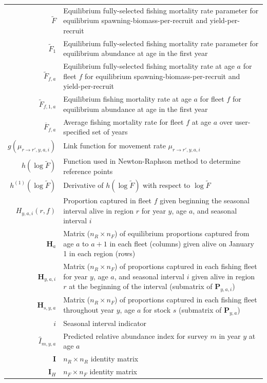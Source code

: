 \documentclass[
]{article}
\begin{document}
\begin{longtable}[c]{r p{}}
$\widetilde{F}$ & Equilibrium fully-selected fishing mortality rate parameter for equilibrium spawning-biomass-per-recruit and yield-per-recruit\\
$\widetilde{F}_1$ & Equilibrium fully-selected fishing mortality rate parameter for equilibrium abundance at age in the first year\\
$\widetilde{F}_{f,a}$ & Equilibrium fully-selected fishing mortality rate at age $a$ for fleet $f$ for equilibrium spawning-biomass-per-recruit and yield-per-recruit\\
$\widetilde{F}_{f,1,a}$ & Equilibrium fishing mortality rate at age $a$ for fleet $f$ for equilibrium abundance at age in the first year\\
$\overline{F}_{f,a}$ & Average fishing mortality rate for fleet $f$ at age $a$ over user-specified set of years\\
$g(\mu_{r\rightarrow r',y,a,i})$ & Link function for movement rate $\mu_{r\rightarrow r',y,a,i}$\\
$h(\log \widetilde{F})$ & Function used in Newton-Raphson method to determine reference points\\
$h^{(1)}(\log \widetilde{F})$ & Derivative of $h(\log \widetilde{F})$ with respect to $\log \widetilde{F}$\\
$H_{y,a,i}(r,f)$ & Proportion captured in fleet $f$ given beginning the seasonal interval alive in region $r$ for year $y$, age $a$, and seasonal interval $i$ \\
$\mathbf{H}_{a}$ & Matrix ($n_R \times n_F$) of equilibrium proportions captured from age $a$ to $a+1$ in each fleet (columns) given alive on January 1 in each region (rows)\\
$\mathbf{H}_{y,a,i}$ &  Matrix ($n_R \times n_F$) of proportions captured in each fishing fleet for year $y$, age $a$, and seasonal interval $i$ given alive in region $r$ at the beginning of the interval (submatrix of $\mathbf{P}_{y,a,i}$)\\
$\mathbf{H}_{s,y,a}$ &  Matrix ($n_R \times n_F$) of proportions captured in each fishing fleet throughout year $y$, age $a$ for stock $s$ (submatrix of $\mathbf{P}_{y,a}$)\\
$i$ & Seasonal interval indicator \\
$\widehat I_{m,y,a}$ & Predicted relative abundance index for survey $m$ in year $y$ at age $a$ \\
$\mathbf{I}$ & $n_R \times n_R$ identity matrix \\
$\mathbf{I}_{H}$ & $n_F \times n_F$ identity matrix \\

\end{longtable}
\end{document}
